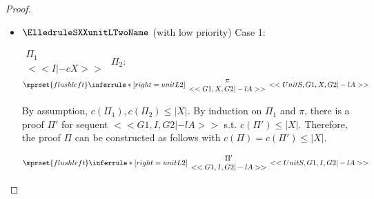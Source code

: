 \begin{proof}
\begin{enumerate}
\begin{itemize}
  \item $\ElledruleSXXunitLTwoName$ (with low priority) Case 1:
    \begin{center}
      \scriptsize
      \begin{math}
        \begin{array}{c}
          \Pi_1 \\
          {<<I |-c X>>}
        \end{array}
      \end{math}
      \qquad\qquad
      $\Pi_2$:
      \begin{math}
        $$\mprset{flushleft}
        \inferrule* [right={\tiny unitL2}] {
          {
            \begin{array}{c}
              \pi \\
              {<<G1, X, G2 |-l A>>}
            \end{array}
          }
        }{<<UnitS, G1, X, G2 |-l A>>}
      \end{math}
    \end{center}
    By assumption, $c(\Pi_1),c(\Pi_2)\leq |X|$. By induction on $\Pi_1$ and $\pi$, there is a
    proof $\Pi'$ for sequent $<<G1, I, G2 |-l A>>$ s.t. $c(\Pi') \leq |X|$. Therefore, the
    proof $\Pi$ can be constructed as follows with $c(\Pi) = c(\Pi') \leq |X|$.
    \begin{center}
      \scriptsize
      \begin{math}
        $$\mprset{flushleft}
        \inferrule* [right={\tiny unitL2}] {
          {
            \begin{array}{c}
              \Pi' \\
              {<<G1, I, G2 |-l A>>}
            \end{array}
          }
        }{<<UnitS, G1, I, G2 |-l A>>}
      \end{math}
    \end{center}


\end{itemize}
\end{enumerate}
\end{proof}
